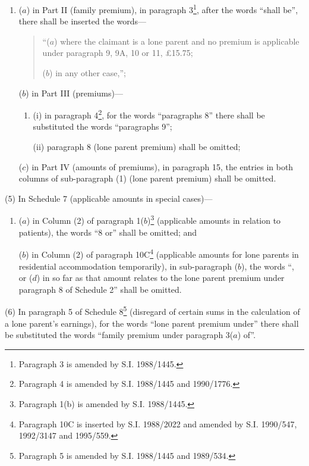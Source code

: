 \documentclass[a4paper]{article}
\begin{document}
\begin{enumerate}\item[]
($a$) in Part II (family premium), in paragraph 3\footnote{\frenchspacing Paragraph 3 is amended by S.I. 1988/1445.}, after the words “shall be”, there shall be inserted the words—
\begin{quotation}
“($a$) where the claimant is a lone parent and no premium is applicable under paragraph 9, 9A, 10 or 11, £15.75;

($b$) in any other case,”;
\end{quotation}

($b$) in Part III (premiums)—
\begin{enumerate}\item[]
(i) in paragraph 4\footnote{\frenchspacing Paragraph 4 is amended by S.I. 1988/1445 and 1990/1776.}, for the words “paragraphs 8” there shall be substituted the words “paragraphs 9”;

(ii) paragraph 8 (lone parent premium) shall be omitted;
\end{enumerate}

($c$) in Part IV (amounts of premiums), in paragraph 15, the entries in both columns of sub-paragraph (1) (lone parent premium) shall be omitted.
\end{enumerate}

(5) In Schedule 7 (applicable amounts in special cases)—
\begin{enumerate}\item[]
($a$) in Column (2) of paragraph 1($b$)\footnote{\frenchspacing Paragraph 1(b) is amended by S.I. 1988/1445.} (applicable amounts in relation to patients), the words “8 or” shall be omitted; and

($b$) in Column (2) of paragraph 10C\footnote{\frenchspacing Paragraph 10C is inserted by S.I. 1988/2022 and amended by S.I. 1990/547, 1992/3147 and 1995/559.} (applicable amounts for lone parents in residential accommodation temporarily), in sub-paragraph ($b$), the words “, or ($d$) in so far as that amount relates to the lone parent premium under paragraph 8 of Schedule 2” shall be omitted.
\end{enumerate}

(6) In paragraph 5 of Schedule 8\footnote{\frenchspacing Paragraph 5 is amended by S.I. 1988/1445 and 1989/534.} (disregard of certain sums in the calculation of a lone parent’s earnings), for the words “lone parent premium under” there shall be substituted the words “family premium under paragraph 3($a$) of”.
\end{document}
